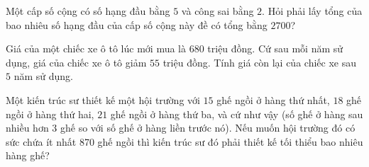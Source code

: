 \begin{bt}%
	Một cấp số cộng có số hạng đầu bằng $5$ và công sai bằng $2$. Hỏi phải lấy tổng của bao nhiêu số hạng đầu của cấp số cộng này đề có tổng bằng $2700$?
\end{bt}

\begin{bt}%
	Giá của một chiếc xe ô tô lúc mới mua là 680 triệu đồng. Cứ sau mỗi năm sử dụng, giá của chiếc xe ô tô giảm $55$ triệu đồng. Tính giá còn lại của chiếc xe sau $5$ năm sử dụng.
\end{bt}

\begin{bt}%
	Một kiến trúc sư thiết kế một hội trường với $15$ ghế ngồi ở hàng thứ nhất, $18$ ghế ngồi ở hàng thứ hai, $21$ ghế ngồi ở hàng thứ ba, và cứ như vậy (số ghế ở hàng sau nhiều hơn $3$ ghế so với số ghế ở hàng liền trước nó). Nếu muốn hội trường đó có sức chứa ít nhất 870 ghế ngồi thì kiến trúc sư đó phải thiết kế tối thiểu bao nhiêu hàng ghế?
\end{bt}

